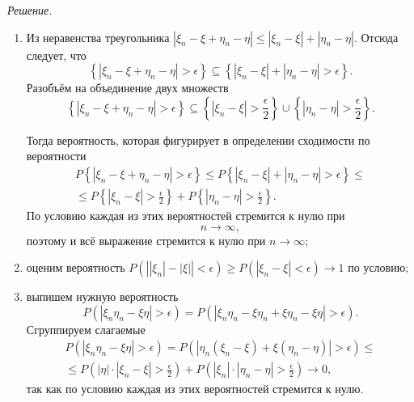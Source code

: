 \textit{Решение.}
\begin{enumerate}[label=\alph*)]
\item Из неравенства треугольника
$ \left| \xi_n - \xi + \eta_n - \eta \right| \leq \left| \xi_n - \xi \right| + \left| \eta_n - \eta \right| $.
Отсюда следует, что
$$ \left\{ \left| \xi_n - \xi + \eta_n - \eta \right| > \epsilon \right\} \subseteq
\left\{ \left| \xi_n - \xi \right| + \left| \eta_n - \eta \right| > \epsilon \right\}.$$
Разобъём на объединение двух множеств
$$ \left\{ \left| \xi_n - \xi + \eta_n - \eta \right| > \epsilon \right\} \subseteq
\left\{ \left| \xi_n - \xi \right| > \frac{ \epsilon }{2} \right\} \cup \left\{ \left| \eta_n - \eta \right| > \frac{ \epsilon }{2} \right\}.$$

Тогда вероятность, которая фигурирует в определении сходимости по вероятности
\begin{equation*}
\begin{split}
P \left\{ \left| \xi_n - \xi + \eta_n - \eta \right| > \epsilon \right\} \leq
P \left\{ \left| \xi_n - \xi \right| + \left| \eta_n - \eta \right| > \epsilon \right\} \leq \\
\leq P \left\{ \left| \xi_n - \xi \right| > \frac{ \epsilon }{2} \right\} + P \left\{ \left| \eta_n - \eta \right| > \frac{ \epsilon }{2} \right\}.
\end{split}
\end{equation*}
По условию каждая из этих вероятностей стремится к нулю при
$$n \rightarrow \infty,$$
поэтому и всё выражение стремится к нулю при $n \rightarrow \infty $;
\item оценим вероятность
$P \left( \left| \left| \xi_n \right| - \left| \xi \right| \right| < \epsilon \right) \geq
P \left( \left| \xi_n - \xi \right| < \epsilon \right) \rightarrow
1$
по условию;
\item выпишем нужную вероятность
$$P \left( \left| \xi_n \eta_n - \xi \eta \right| > \epsilon \right) =
P \left( \left| \xi_n \eta_n - \xi \eta_n + \xi \eta_n - \xi \eta \right| > \epsilon \right).$$
Сгруппируем слагаемые
\begin{equation*}
\begin{split}
P \left( \left| \xi_n \eta_n - \xi \eta \right| > \epsilon \right) =
P \left( \left| \eta_n \left( \xi_n - \xi \right) + \xi \left( \eta_n - \eta \right) \right| > \epsilon \right) \leq \\
\leq P \left( \left| \eta \right| \cdot \left| \xi_n - \xi \right| > \frac{ \epsilon }{2} \right) +
P \left( \left| \xi_n \right| \cdot \left| \eta_n - \eta \right| > \frac{ \epsilon }{2} \right) \rightarrow
0,
\end{split}
\end{equation*}
так как по условию каждая из этих вероятностей стремится к нулю.
\end{enumerate}


